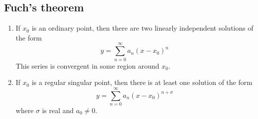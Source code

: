 \subsection{Fuch's theorem}
\begin{theorem}
	\begin{enumerate}
		\item If \(x_0\) is an ordinary point, then there are two linearly independent solutions of the form
		      \[
			      y = \sum_{n=0}^\infty a_n(x-x_0)^n
		      \]
		      This series is convergent in some region around \(x_0\).
		\item If \(x_0\) is a regular singular point, then there is at least one solution of the form
		      \[
			      y = \sum_{n=0}^\infty a_n(x-x_0)^{n + \sigma}
		      \]
		      where \(\sigma\) is real and \(a_0 \neq 0\).
	\end{enumerate}
\end{theorem}
